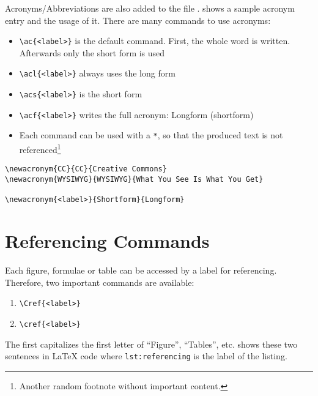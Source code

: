 Acronyms/Abbreviations are also added to the file .  shows a sample acronym entry and the usage of it. There are many commands to use acronyms:

\begin{itemize}
	\item \lstinline[language={[LaTeX]TeX}]!\ac{<label>}! is the default command. First, the whole word is written. Afterwards only the short form is used
	\item \lstinline[language={[LaTeX]TeX}]!\acl{<label>}! always uses the long form
	\item \lstinline[language={[LaTeX]TeX}]!\acs{<label>}! is the short form
	\item \lstinline[language={[LaTeX]TeX}]!\acf{<label>}! writes the full acronym: Longform (shortform)
	\item Each command can be used with a \lstinline!*!, so that the produced text is not referenced\footnote{Another random footnote without important content.}
\end{itemize}

\begin{lstlisting}[language={[LaTeX]TeX},label={lst:acronyms},caption={The use of Abbreviations/Acronyms.}]
\newacronym{CC}{CC}{Creative Commons}
\newacronym{WYSIWYG}{WYSIWYG}{What You See Is What You Get}

\newacronym{<label>}{Shortform}{Longform}
\end{lstlisting}

\section{Referencing Commands}
\label{sec:ReferencingCommands}

Each figure, formulae or table can be accessed by a label for referencing. Therefore, two important commands are available:

\begin{enumerate}
	\item \lstinline[language={[LaTeX]TeX}]!\Cref{<label>}!
	\item \lstinline[language={[LaTeX]TeX}]!\cref{<label>}!
\end{enumerate}

The first capitalizes the first letter of \enquote{Figure}, \enquote{Tables}, etc.  shows these two sentences in {\LaTeX} code where \texttt{lst:referencing} is the label of the listing.

